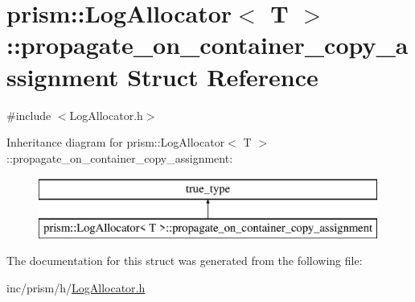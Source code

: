 \hypertarget{structprism_1_1_log_allocator_1_1propagate__on__container__copy__assignment}{}\section{prism\+:\+:Log\+Allocator$<$ T $>$\+:\+:propagate\+\_\+on\+\_\+container\+\_\+copy\+\_\+assignment Struct Reference}
\label{structprism_1_1_log_allocator_1_1propagate__on__container__copy__assignment}


{\ttfamily \#include $<$Log\+Allocator.\+h$>$}

Inheritance diagram for prism\+:\+:Log\+Allocator$<$ T $>$\+:\+:propagate\+\_\+on\+\_\+container\+\_\+copy\+\_\+assignment\+:\begin{figure}[H]
\begin{center}
\leavevmode
\includegraphics[height=2.000000cm]{structprism_1_1_log_allocator_1_1propagate__on__container__copy__assignment}
\end{center}
\end{figure}


The documentation for this struct was generated from the following file\+:\begin{DoxyCompactItemize}
\item 
inc/prism/h/\hyperlink{_log_allocator_8h}{Log\+Allocator.\+h}\end{DoxyCompactItemize}
